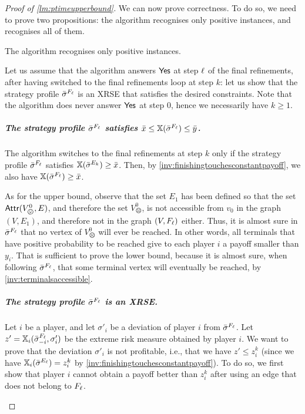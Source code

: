 \begin{proof}[Proof of \cref{lm:ptimeupperbound}]
We can now prove correctness.
To do so, we need to prove two propositions: the algorithm recognises only positive instances, and recognises all of them.


\begin{proposition}
    The algorithm recognises only positive instances.
\end{proposition}

\begin{claimproof}
        Let us assume that the algorithm answers $\mathsf{Yes}$ at step $\ell$ of the final refinements, after having switched to the final refinements loop at step $k$: let us show that the strategy profile ${\bar{\sigma}}^{F_\ell}$ is an XRSE that satisfies the desired constraints.
        Note that the algorithm does never answer $\mathsf{Yes}$ at step $0$, hence we necessarily have $k \geq 1$.

 \subparagraph*{The strategy profile ${\bar{\sigma}}^{F_\ell}$ satisfies ${\bar{x}} \leq \mathbb{X}({{\bar{\sigma}}^{F_\ell} }) \leq {\bar{y}}$.}
        
        The algorithm switches to the final refinements at step $k$ only if the strategy profile ${\bar{\sigma}}^{F_\ell}$ satisfies $\mathbb{X}({\bar{\sigma}}^{E_k}) \geq {\bar{x}}$.
        Then, by \cref{inv:finishingtouchesconstantpayoff}, we also have $\mathbb{X}({\bar{\sigma}}^{F_\ell}) \geq {\bar{x}}$.
        
            
        As for the upper bound, observe that the set $E_1$ has been defined so that the set $\Attr(V_{\frownie}^0, E)$, and therefore the set $V_{\frownie}^0$, is not accessible from $v_0$ in the graph $(V, E_1)$, and therefore not in the graph $(V, F_\ell)$ either.
        Thus, it is almost sure in ${\bar{\sigma}}^{F_\ell}$ that no vertex of $V_{\frownie}^0$ will ever be reached.
        In other words, all terminals that have positive probability to be reached give to each player $i$ a payoff smaller than $y_i$.
        That is sufficient to prove the lower bound, because it is almost sure, when following ${\bar{\sigma}}^{F_\ell}$, that some terminal vertex will eventually be reached, by \cref{inv:terminalsaccessible}.
            

        \subparagraph*{The strategy profile ${\bar{\sigma}}^{F_\ell}$ is an XRSE.}
        
        Let $i$ be a player, and let $\sigma'_i$ be a deviation of player $i$ from ${\bar{\sigma}}^{F_\ell}$.
        Let $z' = \mathbb{X}_i({{\bar{\sigma}}^{F_\ell}_{-i}, \sigma'_i})$ be the extreme risk measure obtained by player $i$.
        We want to prove that the deviation $\sigma'_i$ is not profitable, i.e., that we have $z' \leq z_i^k$ (since we have $\mathbb{X}_i({\bar{\sigma}}^{E_\ell}) = z_i^k$ by \cref{inv:finishingtouchesconstantpayoff}).
        To do so, we first show that player $i$ cannot obtain a payoff better than $z_i^k$ after using an edge that does not belong to $F_\ell$.


\end{claimproof}
\end{proof}
